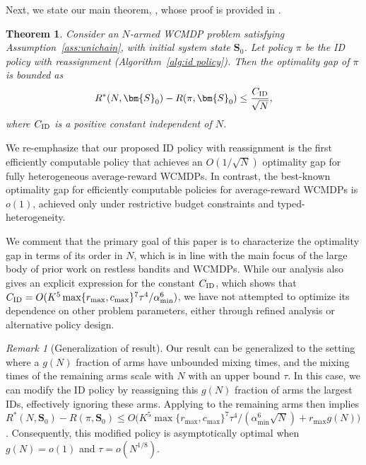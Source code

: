 \documentclass{article}
\theoremstyle{plain}
\newtheorem{theorem}{Theorem}
\theoremstyle{remark}
\newtheorem{remark}{\textit{Remark}}
\newcommand{\ID}{\textnormal{ID}}
\begin{document}
Next, we state our main theorem, , whose proof is provided in .
\begin{theorem}
\label{thm:opt-gap-bound}
    Consider an $N$-armed WCMDP problem satisfying Assumption~\ref{ass:unichain}, with initial system state $\bm{S}_0$. Let policy $\pi$ be the ID policy with reassignment (Algorithm~\ref{alg:id policy}). Then the optimality gap of $\pi$ is bounded as
    \begin{align*}
        R^*(N,\bm{S}_0)-R(\pi,\bm{S}_0) \leq\frac{C_{\ID}}{\sqrt{N}},
    \end{align*}
    where $C_{\ID}$ is a positive constant independent of $N$. 
\end{theorem}


We re-emphasize that our proposed ID policy with reassignment is the first efficiently computable policy that achieves an $O(1/\sqrt{N})$ optimality gap for fully heterogeneous average-reward WCMDPs.
In contrast, the best-known optimality gap for efficiently computable policies for average-reward WCMDPs is $o(1)$, achieved only under restrictive budget constraints and typed-heterogeneity. 


We comment that the primary goal of this paper is to characterize the optimality gap in terms of its order in $N$, which is in line with the main focus of the large body of prior work on restless bandits and WCMDPs.
While our analysis also gives an explicit expression for the constant $C_{\ID}$, which shows that $C_{\ID}=O(K^5 \max\{r_{\max}, c_{\max}\}^7 \tau^4/\alpha_{\min}^6)$, we have not attempted to optimize its dependence on other problem parameters, either through refined analysis or alternative policy design. 




\begin{remark}[Generalization of result]
    Our result can be generalized to the setting where a $g(N)$ fraction of arms have unbounded mixing times, and the mixing times of the remaining arms scale with $N$ with an upper bound $\tau$. In this case, we can modify the ID policy by reassigning this $g(N)$ fraction of arms the largest IDs, effectively ignoring these arms. Applying  to the remaining arms then implies $R^*(N,\bm{S}_0)-R(\pi,\bm{S}_0) \leq O\big(K^5 \max\{r_{\max}, c_{\max}\}^7 \tau^4/ (\alpha_{\min}^6 \sqrt{N})  + r_{\max} g(N)\big)$. Consequently, this modified policy is asymptotically optimal when $g(N) = o(1)$ and $\tau = o(N^{1/8})$. 
\end{remark}
\end{document}

